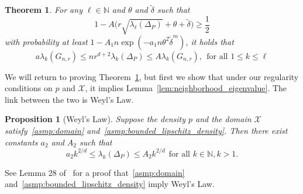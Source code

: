 \documentclass[twoside]{article}
\newcommand{\1}{\mathbf{1}}
\newcommand{\Xset}{\mathcal{X}}
\newcommand{\wt}[1]{\widetilde{#1}}
\newtheorem{theorem}{Theorem}
\newtheorem{proposition}{Proposition}
\theoremstyle{definition}
\theoremstyle{remark}
\begin{document}
\begin{theorem}
	\label{thm:neighborhood_eigenvalue}
	For any $\ell \in \mathbb{N}$ and $\theta$ and $\wt{\delta}$ such that
	\begin{equation}
	\label{eqn:neighborhood_eigenvalue_1}
	1 - A\Biggl(r \sqrt{\lambda_{\ell}(\Delta_P)} + \theta + \wt{\delta}\Biggr)\geq \frac{1}{2}
	\end{equation}
	with probability at least $1 - A_1n\exp(-a_1n\theta^2\wt{\delta}^{m})$, it holds that
	\begin{equation}
	\label{eqn:eigenvalue_bound}
	a \lambda_k(G_{n,r}) \leq nr^{d+2} \lambda_k(\Delta_P) \leq A \lambda_k(G_{n,r}),~~\textrm{for all $1 \leq k \leq \ell$}
	\end{equation}
\end{theorem}
We will return to proving Theorem~\ref{thm:neighborhood_eigenvalue}, but first we show that under our regularity conditions on $p$ and $\Xset$, it implies Lemma~\ref{lem:neighborhood_eigenvalue}. The link between the two is Weyl's Law.
\begin{proposition}[Weyl's Law]
	\label{prop:weyl}
	Suppose the density $p$ and the domain $\Xset$ satisfy~\ref{asmp:domain} and~\ref{asmp:bounded_lipschitz_density}. Then there exist constants $a_2$ and $A_2$ such that
	\begin{equation}
	\label{eqn:weyls_law}
	a_2k^{2/d} \leq \lambda_k(\Delta_P) \leq A_2k^{2/d}~~\textrm{for all $k \in \mathbb{N}, k > 1$}.
	\end{equation}
\end{proposition}
See Lemma 28 of~\citep{dunlop2020} for a proof that~\ref{asmp:domain} and~\ref{asmp:bounded_lipschitz_density} imply Weyl's Law.
\end{document}
